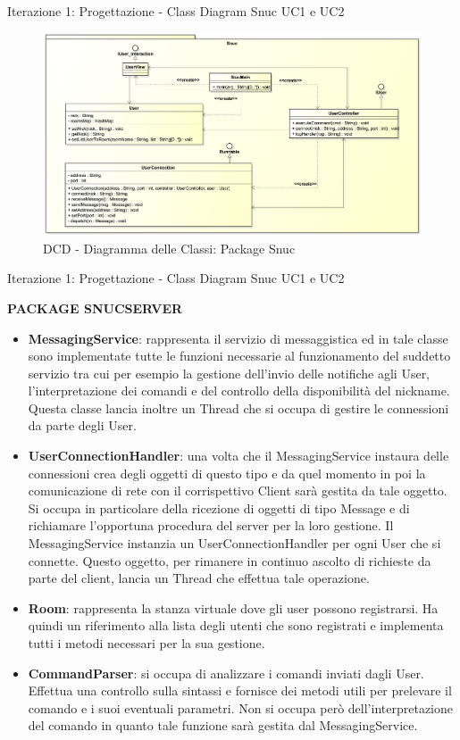 \begin{frame} {Iterazione 1: Progettazione - Class Diagram Snuc UC1 e UC2}
   \begin{figure}
     \includegraphics[scale=0.170]{image_astah/Iteration_1_DesignModel/ClassDiagramSnuc.png}{\centering}
     \caption{DCD - Diagramma delle Classi: Package Snuc }
     \label{fig_UC1_UC2_DCD_3} 
   \end{figure}
\end{frame}

\begin{frame} [allowframebreaks] {Iterazione 1: Progettazione - Class Diagram Snuc UC1 e UC2}
  \centerline{\textbf{PACKAGE SNUCSERVER}}
  \begin{itemize}
   \item \textbf{MessagingService}: rappresenta il servizio di messaggistica ed in tale classe sono implementate tutte le funzioni necessarie al 
         funzionamento del suddetto servizio tra cui per esempio la gestione dell'invio delle notifiche agli User, l'interpretazione dei comandi e del controllo 
         della disponibilità del nickname. Questa classe lancia inoltre un Thread che si occupa di gestire le connessioni da parte degli User.
   \item \textbf{UserConnectionHandler}: una volta che il MessagingService instaura delle connessioni crea degli oggetti di questo tipo e da quel momento in poi la 
         comunicazione di rete con il corrispettivo Client sarà gestita da tale oggetto. Si occupa in particolare della ricezione di oggetti di tipo Message e di 
         richiamare l'opportuna procedura del server per la loro gestione. Il MessagingService instanzia un UserConnectionHandler per ogni User che si connette. 
         Questo oggetto, per rimanere in continuo ascolto di richieste da parte del client, lancia un Thread che effettua tale operazione.
   \item \textbf{Room}: rappresenta la stanza virtuale dove gli user possono registrarsi. Ha quindi un riferimento alla lista degli utenti che sono registrati e 
         implementa tutti i metodi necessari per la sua gestione.
   \item \textbf{CommandParser}: si occupa di analizzare i comandi inviati dagli User. Effettua una controllo sulla sintassi e fornisce dei metodi utili per 
         prelevare il comando e i suoi eventuali parametri. Non si occupa però dell'interpretazione del comando in quanto tale funzione sarà gestita dal 
         MessagingService. 
  \end{itemize} 
\end{frame}

